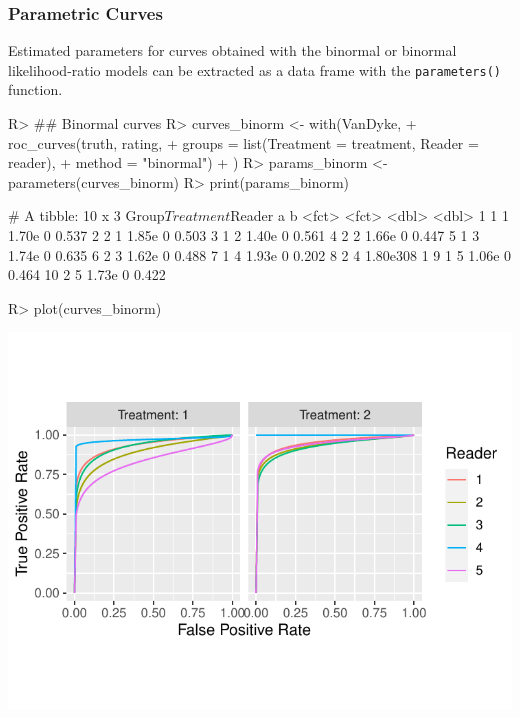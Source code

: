 \documentclass[
]{jss}
\begin{document}
\hypertarget{parametric-curves}{%
\subsubsection{Parametric Curves}\label{parametric-curves}}

Estimated parameters for curves obtained with the binormal or binormal
likelihood-ratio models can be extracted as a data frame with the
\texttt{parameters()} function.

\begin{CodeChunk}
\begin{CodeInput}
R> ## Binormal curves
R> curves_binorm <- with(VanDyke, {
+   roc_curves(truth, rating,
+              groups = list(Treatment = treatment, Reader = reader),
+              method = "binormal")
+ })
R> params_binorm <- parameters(curves_binorm)
R> print(params_binorm)
\end{CodeInput}
\begin{CodeOutput}
# A tibble: 10 x 3
   Group$Treatment $Reader        a     b
   <fct>           <fct>      <dbl> <dbl>
 1 1               1       1.70e  0 0.537
 2 2               1       1.85e  0 0.503
 3 1               2       1.40e  0 0.561
 4 2               2       1.66e  0 0.447
 5 1               3       1.74e  0 0.635
 6 2               3       1.62e  0 0.488
 7 1               4       1.93e  0 0.202
 8 2               4       1.80e308 1    
 9 1               5       1.06e  0 0.464
10 2               5       1.73e  0 0.422
\end{CodeOutput}
\begin{CodeInput}
R> plot(curves_binorm)
\end{CodeInput}


\begin{center}\includegraphics{MRMCaov_files/figure-latex/using_curves_binorm-1} \end{center}

\end{CodeChunk}
\end{document}

